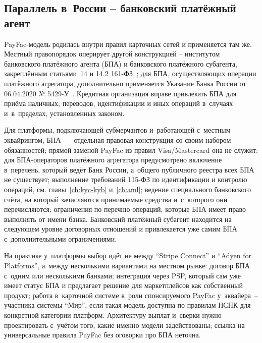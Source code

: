 
\subsection*{Параллель в~России -- банковский платёжный агент}

PayFac-модель родилась внутри правил карточных сетей и применяется
там же. Местный правопорядок оперирует другой конструкцией --
институтом банковского платёжного агента (БПА) и банковского
платёжного субагента, закреплённым статьями~14 и 14.2
161-ФЗ~\cite{fz-161}; для БПА, осуществляющих операции платёжного
агрегатора, дополнительно применяется Указание Банка России от
06.04.2020 № 5429-У~\cite{cbr-5429u}. Кредитная организация вправе
привлекать БПА для приёма наличных, переводов, идентификации и
иных операций в~случаях и~в~пределах, установленных законом.

Для платформы, подключающей субмерчантов и~работающей с~местным
эквайрингом, БПА~--- отдельная правовая конструкция со своим набором
обязанностей; прямой заменой PayFac из правил Visa/Mastercard
она не служит:
для БПА-операторов платёжного агрегатора предусмотрено включение
в~перечень, который ведёт Банк России, а~общего публичного реестра
всех БПА не существует; выполнение требований 115-ФЗ по
идентификации и контролю операций, см. главы~\ref{ch:kyc-kyb}
и~\ref{ch:aml}; ведение специального банковского счёта, на который
зачисляются принимаемые средства и~с~которого они перечисляются;
ограничения по перечню операций, которые БПА имеет право выполнять
от имени банка. Банковский платёжный субагент находится на следующем
уровне договорных отношений и привлекается уже самим БПА
с~дополнительными ограничениями.

На практике у~платформы выбор идёт не между \enquote{Stripe
Connect} и \enquote{Adyen for Platforms}, а~между несколькими
вариантами на местном рынке: договор БПА с~одним или несколькими
банками; интеграция через PSP, который сам уже имеет статус БПА и
предлагает решение для маркетплейсов как собственный продукт;
работа в~карточной системе в~роли спонсируемого PayFac у~эквайера~--
участника системы \enquote{Мир}, если такая модель
доступна по правилам НСПК для конкретной категории платформ.
Архитектуру выплат и~сверки нужно проектировать с~учётом того, какие
именно модели задействованы; ссылка на универсальные правила PayFac
без оговорки про БПА неточна.
